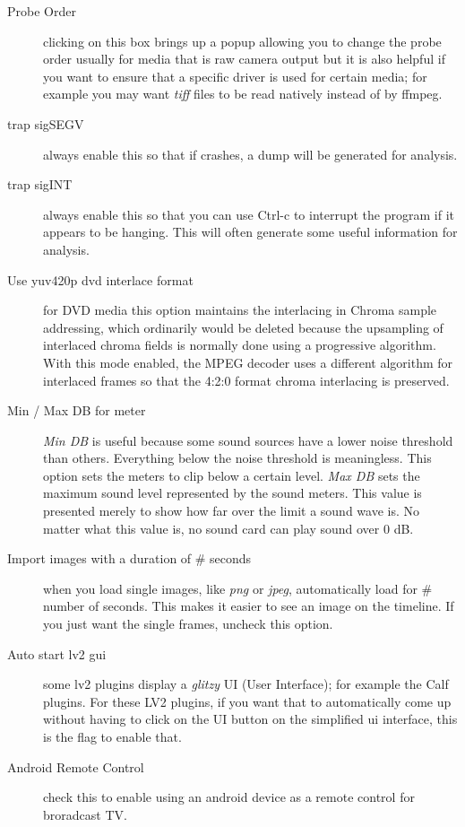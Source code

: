 \begin{description}
    \item[Probe Order]  clicking on this box brings up a popup allowing you to change the probe order usually for media that is raw camera output but it is also helpful if you want to ensure that a specific driver is used for certain media; for example you may want \textit{tiff} files to be read natively instead of by ffmpeg.
    \item[trap sigSEGV] always enable this so that if \CGG{} crashes, a dump will be generated for analysis.
    \item[trap sigINT] always enable this so that you can use Ctrl-c to interrupt the program if it appears to be hanging.  This will often generate some useful information for analysis.
    \item[Use yuv420p dvd interlace format]  for DVD media this option maintains the interlacing in Chroma sample addressing, which ordinarily would be deleted because the upsampling of interlaced chroma fields is normally done using a progressive algorithm.  With this mode enabled, the MPEG decoder uses a different algorithm for interlaced frames so that the 4:2:0 format chroma interlacing is preserved.
    \item[Min / Max DB for meter] \textit{Min DB} is useful because some sound sources have a lower noise threshold than others. Everything below the noise threshold is meaningless. This option sets the meters to clip below a certain level.  \textit{Max DB} sets the maximum sound level represented by the sound meters. This value is presented merely to show how far over the limit a sound wave is. No matter what this value is, no sound card can play sound over 0 dB.
    \item[Import images with a duration of \# seconds] when you load single images, like \textit{png} or \textit{jpeg}, automatically load for \# number of seconds.  This makes it easier to see an image on the timeline.  If you just want the single frames, uncheck this option.
    \item[Auto start lv2 gui]  some lv2 plugins display a \textit{glitzy} UI (User Interface); for example the Calf plugins.  For these LV2 plugins, if you want that to automatically come up without having to click on the UI button on the simplified ui interface, this is the flag to enable that.
    \item[Android Remote Control] check this to enable using an android device as a remote control for broradcast TV.

\end{description}
